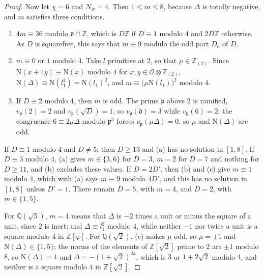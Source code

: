\documentclass[11pt,reqno]{amsart}
\theoremstyle{plain}
\theoremstyle{definition}
\theoremstyle{remark}
\newcommand{\QQ}{\mathbb{Q}}
\newcommand{\ZZ}{\mathbb{Z}}
\newcommand{\cO}{\mathcal{O}}
\newcommand{\Nm}{\mathrm{N}}             %
\begin{document}
\begin{proof}
Now let $\chi=6$ and $N_{w}=4$. Then $1\le m\le8$, because $\Delta$ is
totally negative, and $m$ satisfies three conditions.
\begin{enumerate}[label=\textup{(\alph*)},leftmargin=2.6em,itemsep=2pt]
\item $4m\equiv36$ modulo $\mathfrak d\cap\ZZ$, which is $D\ZZ$ if
  $D\equiv1$ modulo $4$ and $2D\ZZ$ otherwise. As $D$ is squarefree, this
  says that $m\equiv9$ modulo the odd part $D_{o}$ of $D$.
\item $m\equiv0$ or $1$ modulo $4$. Take $l$ primitive at $2$, so that
  $\mu\in\ZZ_{(2)}$. Since $\Nm(x+4y)\equiv\Nm(x)$ modulo $4$ for
  $x,y\in\cO\otimes\ZZ_{(2)}$, $\Nm(\Delta)\equiv\Nm(l_{1}^{2})=\Nm(l_{1})^{2}$,
  and $m\equiv\bigl(\mu\Nm(l_{1})\bigr)^{2}$ modulo $4$.
\item If $D\equiv2$ modulo $4$, then $m$ is odd. The prime $\mathfrak p$ above
  $2$ is ramified, $v_{\mathfrak p}(2)=2$ and $v_{\mathfrak p}(\sqrt D)=1$, so
  $v_{\mathfrak p}(\mathfrak d)=3$ while $v_{\mathfrak p}(6)=2$; the congruence
  $6\equiv2\mu\Delta$ modulo $\mathfrak p^{3}$ forces
  $v_{\mathfrak p}(\mu\Delta)=0$, so $\mu$ and $\Nm(\Delta)$ are odd.
\end{enumerate}
If $D\equiv1$ modulo $4$ and $D\ne5$, then $D\ge13$ and (a) has no solution
in $[1,8]$. If $D\equiv3$ modulo $4$, (a) gives $m\in\{3,6\}$ for $D=3$,
$m=2$ for $D=7$ and nothing for $D\ge11$, and (b) excludes these values. If
$D=2D'$, then (b) and (c) give $m\equiv1$ modulo $4$, which with (a) says
$m\equiv9$ modulo $4D'$, and this has no solution in $[1,8]$ unless $D'=1$.
There remain $D=5$, with $m=4$, and $D=2$, with $m\in\{1,5\}$.

For $\QQ(\sqrt5)$, $m=4$ means that $\Delta$ is $-2$ times a unit or minus the
square of a unit, since $2$ is inert; and $\Delta\equiv l_{1}^{2}$ modulo $4$,
while neither $-1$ nor twice a unit is a square modulo $4$ in $\ZZ[\varphi]$.
For $\QQ(\sqrt2)$, (c) makes $\mu$ odd, so $\mu=\pm1$ and
$\Nm(\Delta)\in\{1,5\}$; the norms of the elements of $\ZZ[\sqrt2]$ prime to
$2$ are $\pm1$ modulo $8$, so $\Nm(\Delta)=1$ and $\Delta=-(1+\sqrt2)^{2k}$,
which is $3$ or $1+2\sqrt2$ modulo $4$, and neither is a square modulo $4$ in
$\ZZ[\sqrt2]$.
\end{proof}
\end{document}

